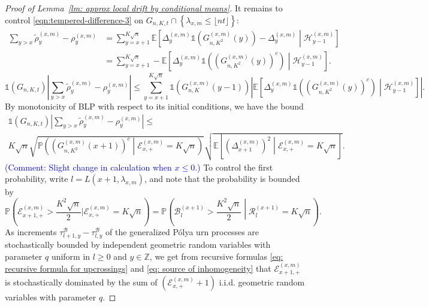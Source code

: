 \documentclass[twoside,12pt, a4paper]{article}
\numberwithin{equation}{section}
\theoremstyle{remark}
\newcommand{\comment}[1]{\textcolor{blue}{(Comment: #1)}}
\begin{document}
\begin{proof}[Proof of Lemma~\ref{lm: approx local drift by conditional means}]
		It remains to control  \eqref{eqn:tempered-difference-3} on $G_{n, K, t} \cap \left\{\lambda_{x,m} \leq\lfloor nt \rfloor \right\}$:
		\begin{align*}
			\sum_{y > x} \tilde\rho_y^{(x,m)} - \rho_y^{(x,m)}
			&= \sum_{y = x + 1}^{K \sqrt{n} } \mathbb{E}\left[ \Delta_y^{(x,m)}\mathbb{1}\left( G_{n, K^2}^{(x,m)}(y) \right) - \Delta_{y}^{(x,m)} \middle| \mathcal{H}_{y-1}^{(x,m)}  \right]  \\
			&= \sum_{y = x + 1}^{K \sqrt{n} } -\mathbb{E}\left[ \Delta_y^{(x,m)}\mathbb{1}\left( \left( G_{n, K^2}^{(x,m)}(y) \right) ^c \right) \middle| \mathcal{H}_{y-1}^{(x,m)}  \right]
			.\end{align*}
		\[
		\mathbb{1}(G_{n, K, t}) \left| 
		\sum_{y > x} \tilde\rho_y^{(x,m)} - \rho_y^{(x,m)}
		\right| 
		\le  \sum_{y = x + 1}^{K \sqrt{n} } \mathbb{1}\left(G_{n, K}^{(x,m)}(y-1)\right) 
		\left|  \mathbb{E}\left[ \Delta_y^{(x,m)}\mathbb{1}\left( \left( G_{n, K^2}^{(x,m)}(y) \right) ^c \right) \middle| \mathcal{H}_{y-1}^{(x,m)}  \right] \right| 
		.\] 
		By monotonicity of BLP with respect to its initial conditions, we have the bound
		\begin{multline*}
			\mathbb{1}(G_{n, K, t})
			\left| \sum_{y > x} \tilde\rho_y^{(x,m)} - \rho_y^{(x,m)} \right| \le \\
			K \sqrt{n} 
			\sqrt{ \mathbb{P}\left( \left( G^{(x,m)}_{n, K^2}(x+1) \right) ^{c} \middle| \mathcal{E}_{x,+}^{(x,m)} = K \sqrt{n}  \right) }
			\sqrt{ \mathbb{E}\left[ \left(\Delta_{x+1}^{(x,m)}\right)^2 \middle| \mathcal{E}_{x,+}^{(x,m)} = K \sqrt{n}  \right]}
			.\end{multline*}
		\comment{Slight change in calculation when $x\leq 0$.}
		To control the first probability, write $l = L\left( x+1, \lambda_{x, m} \right) $, and note that the probability is bounded by 
		\[
		\mathbb{P}\left(\mathcal{E}_{x+1,+}^{(x,m)} > \frac{K^2 \sqrt{n} }{2} | \mathcal{E}_{x,+}^{(x, m)} = K \sqrt{n}\right)
		= \mathbb{P}\left(\mathcal{B}^{(x+1)}_{l} > \frac{K^2 \sqrt{n} }{2}  \middle| \mathcal{R}^{(x + 1)}_l = K \sqrt{n}  \right)
		.\] 
		As increments $\tau^{\mathcal{B}}_{l+1,y} -\tau^{\mathcal{B}}_{l,y}$ of the generalized P\'{o}lya urn processes are stochastically bounded by independent geometric random variables with parameter $q$ uniform in $l\geq 0$ and $y \in \mathbb{Z}$, we get from recursive formulas \eqref{eq: recursive formula for upcrossings} and \eqref{eq: source of inhomogeneity} that  $\mathcal{E}_{x+1,+}^{(x,m)}$ is stochastically dominated by the sum of $ (\mathcal{E}_{x,+}^{(x,m)} +1) $ i.i.d. geometric random variables with parameter $q$. 

\end{proof}
\end{document}

